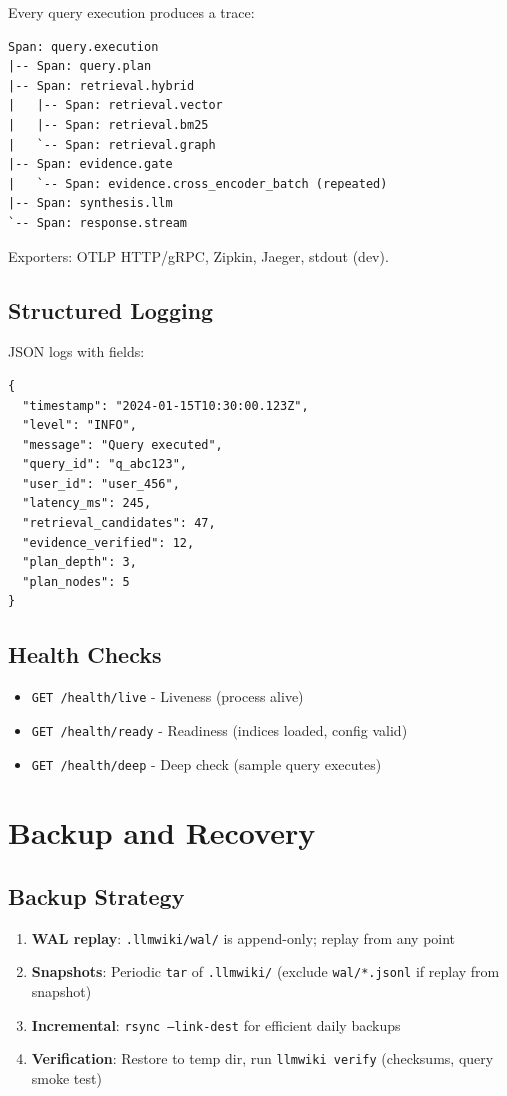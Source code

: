 Every query execution produces a trace:

\begin{verbatim}
Span: query.execution
|-- Span: query.plan
|-- Span: retrieval.hybrid
|   |-- Span: retrieval.vector
|   |-- Span: retrieval.bm25
|   `-- Span: retrieval.graph
|-- Span: evidence.gate
|   `-- Span: evidence.cross_encoder_batch (repeated)
|-- Span: synthesis.llm
`-- Span: response.stream
\end{verbatim}

Exporters: OTLP HTTP/gRPC, Zipkin, Jaeger, stdout (dev).

\subsection{Structured Logging}
\label{sec:deploy:logging}

JSON logs with fields:
\begin{verbatim}
{
  "timestamp": "2024-01-15T10:30:00.123Z",
  "level": "INFO",
  "message": "Query executed",
  "query_id": "q_abc123",
  "user_id": "user_456",
  "latency_ms": 245,
  "retrieval_candidates": 47,
  "evidence_verified": 12,
  "plan_depth": 3,
  "plan_nodes": 5
}
\end{verbatim}

\subsection{Health Checks}
\label{sec:deploy:health}

\begin{itemize}
  \item \texttt{GET /health/live} - Liveness (process alive)
  \item \texttt{GET /health/ready} - Readiness (indices loaded, config valid)
  \item \texttt{GET /health/deep} - Deep check (sample query executes)
\end{itemize}

\section{Backup and Recovery}
\label{sec:deploy:backup}

\subsection{Backup Strategy}
\label{sec:deploy:backup-strategy}

\begin{enumerate}
  \item \textbf{WAL replay}: \texttt{.llmwiki/wal/} is append-only; replay from any point
  \item \textbf{Snapshots}: Periodic \texttt{tar} of \texttt{.llmwiki/} (exclude \texttt{wal/*.jsonl} if replay from snapshot)
  \item \textbf{Incremental}: \texttt{rsync --link-dest} for efficient daily backups
  \item \textbf{Verification}: Restore to temp dir, run \texttt{llmwiki verify} (checksums, query smoke test)
\end{enumerate}

